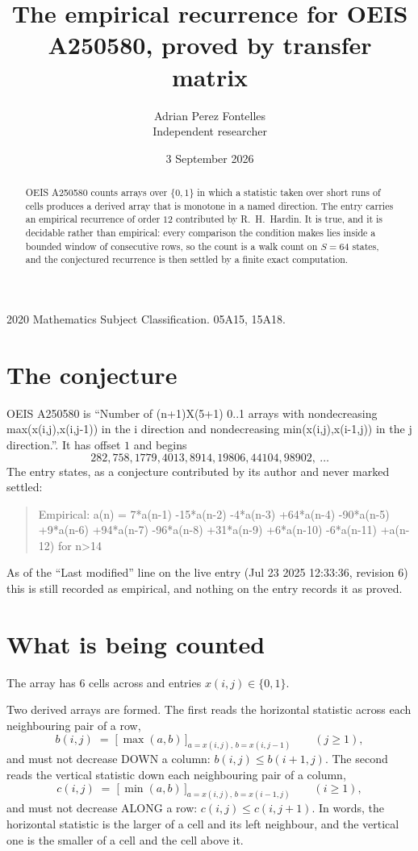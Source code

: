 \documentclass[11pt,a4paper]{article}
\title{The empirical recurrence for OEIS A250580, proved by transfer matrix}
\author{Adrian Perez Fontelles\\ \small Independent researcher}
\date{3 September 2026}
\theoremstyle{plain}
\theoremstyle{definition}
\begin{document}
\maketitle

\begin{abstract}
OEIS A250580 counts arrays over $\{0,1\}$ in which a statistic taken over short runs
of cells produces a derived array that is monotone in a named direction. The entry carries an
empirical recurrence of order $12$ contributed by R.~H.~Hardin. It is true, and it is
decidable rather than empirical: every comparison the condition makes lies inside a bounded
window of consecutive rows, so the count is a walk count on $S=64$ states, and the
conjectured recurrence is then settled by a finite exact computation.
\end{abstract}

\noindent\small 2020 Mathematics Subject Classification. 05A15, 15A18.\normalsize

\section{The conjecture}

OEIS A250580 is ``Number of (n+1)X(5+1) 0..1 arrays with nondecreasing max(x(i,j),x(i,j-1)) in the i direction and nondecreasing min(x(i,j),x(i-1,j)) in the j direction.''. It has offset $1$ and begins
\[
282, 758, 1779, 4013, 8914, 19806, 44104, 98902,\ \dots
\]
The entry states, as a conjecture contributed by its author and never marked settled:
\begin{quote}
Empirical: a(n) = 7*a(n-1) -15*a(n-2) -4*a(n-3) +64*a(n-4) -90*a(n-5) +9*a(n-6) +94*a(n-7) -96*a(n-8) +31*a(n-9) +6*a(n-10) -6*a(n-11) +a(n-12) for n>14
\end{quote}
As of the ``Last modified'' line on the live entry (Jul 23 2025 12:33:36, revision 6) this is still
recorded as empirical, and nothing on the entry records it as proved.

\section{What is being counted}

The array has $6$ cells across and entries $x(i,j)\in\{0,1\}$.

Two derived arrays are formed. The first reads the horizontal statistic across each
neighbouring pair of a row,
\[
b(i,j)\;=\;\bigl[\,\max(a,b)\,\bigr]_{a=x(i,j),\,b=x(i,j-1)}\qquad (j\ge1),
\]
and must not decrease DOWN a column: $b(i,j)\le b(i{+}1,j)$. The second reads the vertical
statistic down each neighbouring pair of a column,
\[
c(i,j)\;=\;\bigl[\,\min(a,b)\,\bigr]_{a=x(i,j),\,b=x(i{-}1,j)}\qquad (i\ge1),
\]
and must not decrease ALONG a row: $c(i,j)\le c(i,j{+}1)$. In words, the horizontal statistic
is the larger of a cell and its left neighbour, and the vertical one is
the smaller of a cell and the cell above it.
\end{document}
